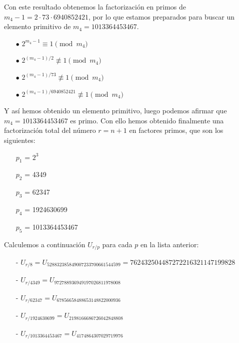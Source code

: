 \documentclass[fleqn]{article}
\begin{document}
    Con este resultado obtenemos la factorización en primos de $m_{4} - 1 = 2 \cdot 73 \cdot 6940852421$, por lo que estamos preparados para buscar un elemento primitivo de $m_{4} = 1013364453467$.
    \begin{enumerate}
        \item[$\bullet$] $2^{m_{4} -1} \equiv 1 \pmod{m_{4}}$
        \item[$\bullet$] $2^{(m_{4} -1)/2} \not\equiv 1 \pmod{m_{4}}$
        \item[$\bullet$] $2^{(m_{4} -1)/73} \not\equiv 1 \pmod{m_{4}}$
        \item[$\bullet$] $2^{(m_{4} -1)/6940852421} \not\equiv 1 \pmod{m_{4}}$
    \end{enumerate}
    Y así hemos obtenido un elemento primitivo, luego podemos afirmar que $m_{4} = 1013364453467$ es primo.
    Con ello hemos obtenido finalmente una factorización total del número $r = n+1$ en factores primos, que son los siguientes:
    \begin{enumerate}
        \item[$p_1$ =] $2^3$
        \item[$p_2$ =] 4349
        \item[$p_3$ =] 62347
        \item[$p_4$ =] 1924630699 
        \item[$p_5$ =] 1013364453467 
    \end{enumerate}
    Calculemos a continuación $U_{r/p}$ para cada $p$ en la lista anterior:
    \begin{enumerate}
        \item[-] $U_{r/8} = U_ {528832385849007233700661544599} = 762432504487272216321147199828$ %
        \item[-] $U_{r/4349} = U_ {972788936949197026811978008}$
        \item[-] $U_{r/62347} = U_ {67856658488653148822000936}$
        \item[-] $U_{r/1924630699} = U_ {2198166686726042848808}$
        \item[-] $U_{r/1013364453467} = U_ {4174864307029719976}$
    \end{enumerate}
\end{document}
